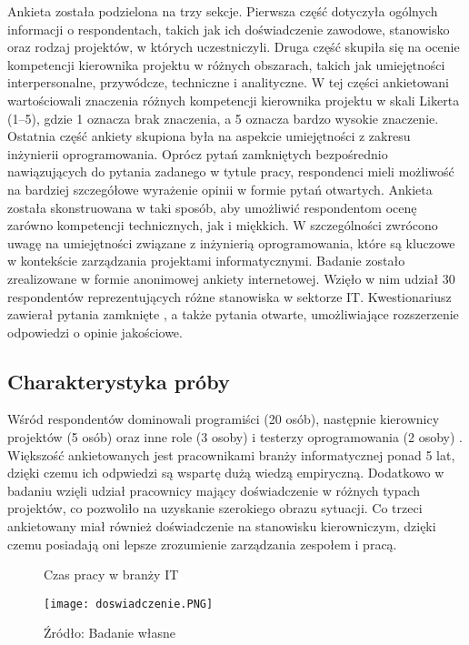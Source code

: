 Ankieta została podzielona na trzy sekcje. Pierwsza część dotyczyła ogólnych informacji o respondentach, takich jak ich doświadczenie zawodowe, stanowisko oraz rodzaj projektów, w których uczestniczyli. Druga część skupiła się na ocenie kompetencji kierownika projektu w różnych obszarach, takich jak umiejętności interpersonalne, przywódcze, techniczne i analityczne. W tej części ankietowani wartościowali znaczenia różnych kompetencji kierownika projektu w skali Likerta (1–5), gdzie 1 oznacza brak znaczenia, a 5 oznacza bardzo wysokie znaczenie. Ostatnia część ankiety skupiona była na aspekcie umiejętności z zakresu inżynierii oprogramowania. Oprócz pytań zamkniętych bezpośrednio nawiązujących do pytania zadanego w tytule pracy, respondenci mieli możliwość na bardziej szczegółowe wyrażenie opinii w formie pytań otwartych.
Ankieta została skonstruowana w taki sposób, aby umożliwić respondentom ocenę zarówno kompetencji technicznych, jak i miękkich. W szczególności zwrócono uwagę na umiejętności związane z inżynierią oprogramowania, które są kluczowe w kontekście zarządzania projektami informatycznymi.
Badanie zostało zrealizowane w formie anonimowej ankiety internetowej. Wzięło w nim udział 30 respondentów reprezentujących różne stanowiska w sektorze IT. Kwestionariusz zawierał pytania zamknięte , a także pytania otwarte, umożliwiające rozszerzenie odpowiedzi o opinie jakościowe.

\subsection{Charakterystyka próby}

Wśród respondentów dominowali programiści (20 osób), następnie kierownicy projektów (5 osób) oraz inne role (3 osoby) i testerzy oprogramowania (2 osoby) . Większość ankietowanych jest pracownikami branży informatycznej ponad 5 lat, dzięki czemu ich odpwiedzi są wspartę dużą wiedzą empiryczną. Dodatkowo w badaniu wzięli udział pracownicy mający doświadczenie w różnych typach projektów, co pozwoliło na uzyskanie szerokiego obrazu sytuacji. Co trzeci ankietowany miał również doświadczenie na stanowisku kierowniczym, dzięki czemu posiadają oni lepsze zrozumienie zarządzania zespołem i pracą.

\begin{figure}
  \caption{Czas pracy w branży IT}
  \centering
  \texttt{[image: doswiadczenie.PNG]}
  \caption*{Źródło: Badanie własne}
\end{figure}

